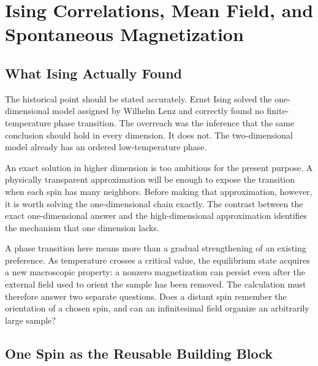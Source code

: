 \chapter{Ising Correlations, Mean Field, and Spontaneous Magnetization}


\section{What Ising Actually Found}

The historical point should be stated accurately. Ernst Ising solved the one-dimensional model assigned by Wilhelm Lenz and correctly found no finite-temperature phase transition. The overreach was the inference that the same conclusion should hold in every dimension. It does not. The two-dimensional model already has an ordered low-temperature phase.

An exact solution in higher dimension is too ambitious for the present purpose. A physically transparent approximation will be enough to expose the transition when each spin has many neighbors. Before making that approximation, however, it is worth solving the one-dimensional chain exactly. The contrast between the exact one-dimensional answer and the high-dimensional approximation identifies the mechanism that one dimension lacks.

A phase transition here means more than a gradual strengthening of an existing preference. As temperature crosses a critical value, the equilibrium state acquires a new macroscopic property: a nonzero magnetization can persist even after the external field used to orient the sample has been removed. The calculation must therefore answer two separate questions. Does a distant spin remember the orientation of a chosen spin, and can an infinitesimal field organize an arbitrarily large sample?

\section{One Spin as the Reusable Building Block}

